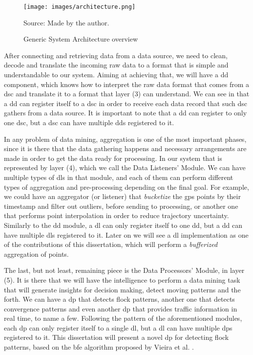 \begin{figure}[h!]
    \centering
    \caption{Generic System Architecture overview}
    \centerline{\texttt{[image: images/architecture.png]}}
    \footnotesize{Source: Made by the author.}
    \label{fig:architecture}
\end{figure}

After connecting and retrieving data from a data source, we need to clean, decode and translate the incoming raw data to
a format that is simple and understandable to our system. Aiming at achieving that, we will have a \ac{dd} component,
which knows how to interpret the raw data format that comes from a \ac{dsc} and translate it to a format that layer (3)
can understand. We can see in  that a \ac{dd} can register itself to a \ac{dsc} in order to
receive each data record that such \ac{dsc} gathers from a data source. It is important to note that a \ac{dd} can
register to only one \ac{dsc}, but a \ac{dsc} can have multiple \acp{dd} registered to it.

In any problem of data mining, aggregation is one of the most important phases, since it is there that the data
gathering happens and necessary arrangements are made in order to get the data ready for processing. In our system that
is represented by layer (4), which we call the Data Listeners' Module. We can have multiple types of \acp{dl} in that
module, and each of them can perform different types of aggregation and pre-processing depending on the final goal.  For
example, we could have an aggregator (or listener) that \textit{bucketize} the \ac{gps} points by their timestamp and
filter out outliers, before sending to processing, or another one that performs point interpolation in order to reduce
trajectory uncertainty. Similarly to the \ac{dd} module, a \ac{dl} can only register itself to one \ac{dd}, but a
\ac{dd} can have multiple \acp{dl} registered to it. Later on we will see a \ac{dl} implementation as one of the
contributions of this dissertation, which will perform a \textit{bufferized} aggregation of points.

The last, but not least, remaining piece is the Data Processors' Module, in layer (5). It is there that we will have the
intelligence to perform a data mining task that will generate insights for decision making, detect moving patterns and
the forth. We can have a \ac{dp} that detects flock patterns, another one that detects convergence patterns and even
another \ac{dp} that provides traffic information in real time, to name a few. Following the pattern of the
aforementioned modules, each \ac{dp} can only register itself to a single \ac{dl}, but a \ac{dl} can have multiple
\acp{dp} registered to it. This dissertation will present a novel \ac{dp} for detecting flock patterns, based on the
\ac{bfe} algorithm proposed by Vieira et al. \citep{vieira}.

